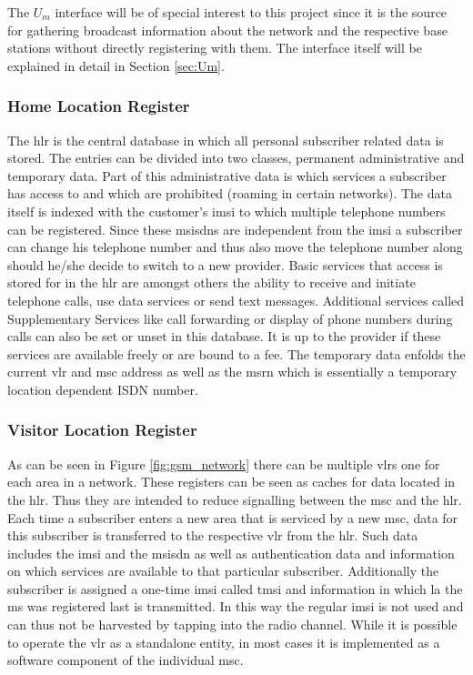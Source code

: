 The $U_m$ interface will be of special interest to this project since it is the source for gathering broadcast information about the network and the respective base stations without directly registering with them.
The interface itself will be explained in detail in Section \ref{sec:Um}.

\subsubsection{Home Location Register}
The \gls{hlr} is the central database in which all personal subscriber related data is stored.
The entries can be divided into two classes, permanent administrative and temporary data.
Part of this administrative data is which services a subscriber has access to and which are prohibited (\eg roaming in certain networks).
The data itself is indexed with the customer's \gls{imsi} to which multiple telephone numbers can be registered.
Since these \glspl{msisdn} are independent from the \gls{imsi} a subscriber can change his telephone number and thus also move the telephone number along should he/she decide to switch to a new provider.
Basic services that access is stored for in the \gls{hlr} are amongst others the ability to receive and initiate telephone calls, use data services or send text messages.
Additional services called Supplementary Services like call forwarding or display of phone numbers during calls can also be set or unset in this database.
It is up to the provider if these services are available freely or are bound to a fee.
The temporary data enfolds the current \gls{vlr} and \gls{msc} address as well as the \gls{msrn} which is essentially a temporary location dependent ISDN number.

\subsubsection{Visitor Location Register}
As can be seen in Figure \ref{fig:gsm_network} there can be multiple \glspl{vlr} one for each area in a network.
These registers can be seen as caches for data located in the \gls{hlr}.
Thus they are intended to reduce signalling between the \gls{msc} and the \gls{hlr}.
Each time a subscriber enters a new area that is serviced by a new \gls{msc}, data for this subscriber is transferred to the respective \gls{vlr} from the \gls{hlr}.
Such data includes the \gls{imsi} and the \gls{msisdn} as well as authentication data and information on which services are available to that particular subscriber.
Additionally the subscriber is assigned a one-time \gls{imsi} called \gls{tmsi} and information in which \gls{la} the \gls{ms} was registered last is transmitted.
In this way the regular \gls{imsi} is not used and can thus not be harvested by tapping into the radio channel.
While it is possible to operate the \gls{vlr} as a standalone entity, in most cases it is implemented as a software component of the individual \gls{msc}.

